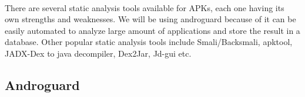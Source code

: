 \documentclass[../main.tex]{subfile}
\begin{document}
	
		\paragraph{} There are several static analysis tools available for APKs, each one having its own strengths and weaknesses. We will be using androguard because of it can be easily automated to analyze large amount of applications and store the result in a database. Other popular static analysis tools include Smali/Backsmali, apktool, JADX-Dex to java decompiler, Dex2Jar, Jd-gui etc.
		
		\subsection{Androguard}\label{sec:androguard}
\end{document}
